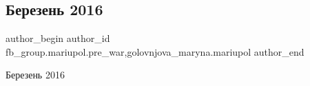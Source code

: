  
 
 
 
 

\subsection{Березень 2016}
\label{sec:02_03_2023.fb.fb_group.mariupol.pre_war.1.berezen_2016}
 
\ifcmt
 author_begin
   author_id fb_group.mariupol.pre_war,golovnjova_maryna.mariupol
 author_end
\fi

Березень 2016
